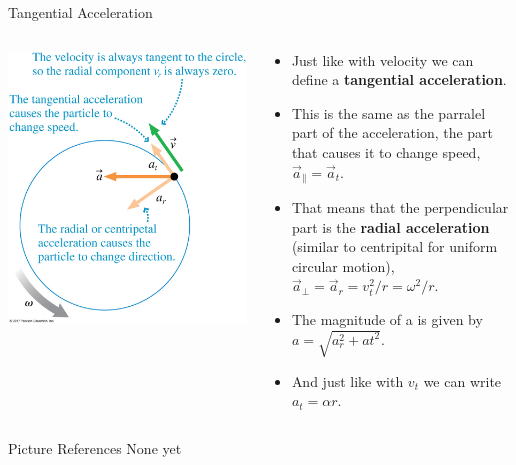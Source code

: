 \documentclass{beamer}
\begin{document}
\begin{frame}{Tangential Acceleration}
\begin{columns}
\begin{column}{0.4\textwidth}
\begin{center}
   \includegraphics[width=\textwidth]{../figures/04_32_Figure.jpg}
\end{center}
\end{column}
\begin{column}{0.6\textwidth}
\begin{itemize}
   \item Just like with velocity we can define a {\bf tangential acceleration}.
   \item This is the same as the parralel part of the acceleration, the part that causes it to change speed, $\vec{a}_\parallel = \vec{a}_t$.
   \item<2-> That means that the perpendicular part is the {\bf radial acceleration} (similar to centripital for uniform circular motion), $\vec{a}_\perp = \vec{a}_r = v_t^2/r = \omega^2/r$.
   \item<3-> The magnitude of a is given by $a=\sqrt{a_r^2+at^2}$.
   \item<4-> And just like with $v_t$ we can write $a_t = \alpha r$.
\end{itemize}
\end{column}
\end{columns}
\end{frame}

\begin{frame}{Picture References}
\tiny
None yet
\end{frame}
\end{document}
